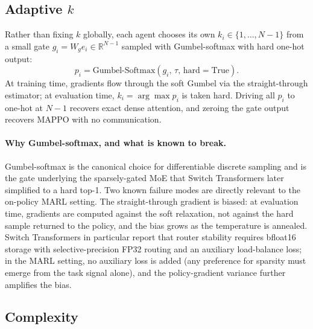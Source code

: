 \subsection{Adaptive $k$}
Rather than fixing $k$ globally, each agent chooses its own
$k_i \in \{1, \ldots, N{-}1\}$ from a small gate
$g_i = W_g e_i \in \mathbb{R}^{N-1}$ sampled with Gumbel-softmax with
hard one-hot output:
\begin{equation}
  p_i = \mathrm{Gumbel\text{-}Softmax}(g_i,\, \tau, \, \text{hard}=\text{True}).
\end{equation}
At training time, gradients flow through the soft Gumbel via the
straight-through estimator; at evaluation time, $k_i = \arg\max p_i$ is
taken hard. Driving all $p_i$ to one-hot at $N{-}1$ recovers exact dense
attention, and zeroing the gate output recovers MAPPO with no
communication.

\paragraph{Why Gumbel-softmax, and what is known to break.}
Gumbel-softmax \citep{jang2017gumbel, maddison2017concrete} is the canonical
choice for differentiable discrete sampling and is the gate underlying the
sparsely-gated MoE \citep{shazeer2017moe} that Switch Transformers
\citep{fedus2022switch} later simplified to a hard top-1. Two known
failure modes are directly relevant to the on-policy MARL setting. The
straight-through gradient is biased: at evaluation time, gradients are
computed against the soft relaxation, not against the hard sample
returned to the policy, and the bias grows as the temperature is
annealed. Switch Transformers in particular report that router stability
requires bfloat16 storage with selective-precision FP32 routing and an
auxiliary load-balance loss; in the MARL setting, no auxiliary loss is
added (any preference for sparsity must emerge from the task signal
alone), and the policy-gradient variance further amplifies the bias.

\subsection{Complexity}
\label{sec:complexity}

